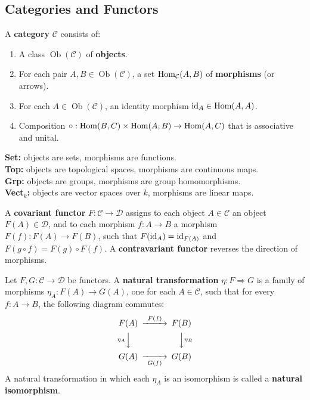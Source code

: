 \subsection{Categories and Functors}

\begin{definition}[Category]
A \textbf{category} $\mathcal{C}$ consists of:
\begin{enumerate}
    \item A class $\operatorname{Ob}(\mathcal{C})$ of \textbf{objects}.
    \item For each pair $A,B \in \operatorname{Ob}(\mathcal{C})$, a set $\operatorname{Hom}_{\mathcal{C}}(A,B)$ of \textbf{morphisms} (or arrows).
    \item For each $A \in \operatorname{Ob}(\mathcal{C})$, an identity morphism $\operatorname{id}_A \in \operatorname{Hom}(A,A)$.
    \item Composition $\circ: \operatorname{Hom}(B,C) \times \operatorname{Hom}(A,B) \to \operatorname{Hom}(A,C)$ that is associative and unital.
\end{enumerate}
\end{definition}

\begin{example}
\textbf{Set:} objects are sets, morphisms are functions.\\
\textbf{Top:} objects are topological spaces, morphisms are continuous maps.\\
\textbf{Grp:} objects are groups, morphisms are group homomorphisms.\\
\textbf{Vect$_k$:} objects are vector spaces over $k$, morphisms are linear maps.
\end{example}

\begin{definition}[Functor]
A \textbf{covariant functor} $F: \mathcal{C} \to \mathcal{D}$ assigns to each object $A \in \mathcal{C}$ an object $F(A) \in \mathcal{D}$, and to each morphism $f: A \to B$ a morphism $F(f): F(A) \to F(B)$, such that $F(\operatorname{id}_A) = \operatorname{id}_{F(A)}$ and $F(g \circ f) = F(g) \circ F(f)$. A \textbf{contravariant functor} reverses the direction of morphisms.
\end{definition}

\begin{definition}
Let $F,G: \mathcal{C} \to \mathcal{D}$ be functors. A \textbf{natural transformation} $\eta: F \Rightarrow G$ is a family of morphisms $\eta_A: F(A) \to G(A)$, one for each $A \in \mathcal{C}$, such that for every $f: A \to B$, the following diagram commutes:
\[
\begin{CD}
F(A) @>{F(f)}>> F(B) \\
@V{\eta_A}VV @VV{\eta_B}V \\
G(A) @>>{G(f)}> G(B)
\end{CD}
\]
A natural transformation in which each $\eta_A$ is an isomorphism is called a \textbf{natural isomorphism}.
\end{definition}

